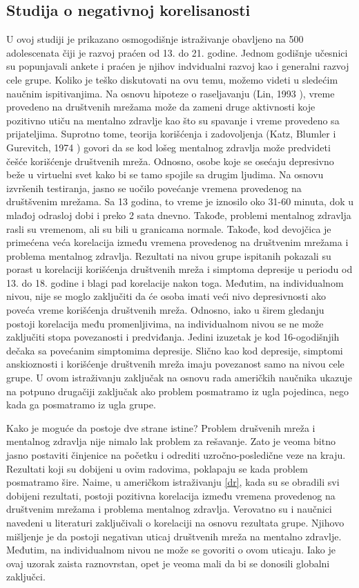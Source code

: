 \documentclass[a4paper]{article}
\begin{document}
{		\subsection{Studija o negativnoj korelisanosti}
		\label{dr}
		U ovoj studiji je prikazano osmogodišnje istraživanje obavljeno na 500 adolescenata čiji je razvoj praćen od 13. do 21. godine. Jednom godišnje učesnici su popunjavali ankete i praćen je njihov indvidualni razvoj kao i generalni razvoj cele grupe. Koliko je teško diskutovati na ovu temu, možemo videti u sledećim naučnim ispitivanjima. Na osnovu hipoteze o raseljavanju  (Lin, 1993 \cite{lin}), vreme provedeno na društvenih mrežama može da zameni druge aktivnosti koje pozitivno utiču na mentalno zdravlje kao što su spavanje i vreme provedeno sa prijateljima. Suprotno tome, teorija korišćenja i zadovoljenja (Katz, Blumler i Gurevitch, 1974 \cite{katz}) govori da se kod lošeg mentalnog zdravlja može predvideti češće korišćenje društvenih mreža. Odnosno, osobe koje se osećaju depresivno beže u virtuelni svet kako bi se tamo spojile sa drugim ljudima. Na osnovu izvršenih testiranja, jasno se uočilo povećanje vremena provedenog na društšvenim mrežama. Sa 13 godina, to vreme je iznosilo oko 31-60 minuta, dok u mlađoj odrasloj dobi i preko 2 sata dnevno. Takođe, problemi mentalnog zdravlja rasli su vremenom, ali su bili u granicama normale. Takođe, kod devojčica je primećena veća korelacija između vremena provedenog na društvenim mrežama i problema mentalnog zdravlja. Rezultati na nivou grupe ispitanih pokazali su porast u korelaciji korišćenja društvenih mreža i simptoma depresije u periodu od 13. do 18. godine i blagi pad korelacije nakon toga. Međutim, na individualnom nivou, nije se moglo zaključiti da će osoba imati veći nivo depresivnosti ako poveća vreme korišćenja društvenih mreža. Odnosno, iako u širem gledanju postoji korelacija među promenljivima, na individualnom nivou se ne može zaključiti stopa povezanosti i predviđanja. Jedini izuzetak je kod 16-ogodišnjih dečaka sa povećanim simptomima depresije. Slično kao kod depresije, simptomi anskioznosti i korišćenje društvenih mreža imaju
		povezanost samo na nivou cele grupe. U ovom istraživanju zaključak na osnovu rada američkih naučnika ukazuje na potpuno drugačiji zaključak ako problem posmatramo iz ugla pojedinca, nego kada ga posmatramo iz ugla grupe.
		
		\hspace{0.5mm}
		Kako je moguće da postoje dve strane istine? Problem drušvenih mreža i mentalnog zdravlja nije nimalo lak problem za rešavanje. Zato je veoma bitno jasno postaviti činjenice na početku i odrediti uzročno-posledične veze na kraju. Rezultati koji su dobijeni u ovim radovima, poklapaju se kada problem posmatramo šire. Naime, u američkom istraživanju \eqref{dr}, kada su se obradili svi dobijeni rezultati, postoji pozitivna korelacija između vremena provedenog na društvenim mrežama i problema mentalnog zdravlja. Verovatno su i naučnici navedeni u literaturi zaključivali o korelaciji na osnovu rezultata grupe. Njihovo mišljenje je da postoji negativan uticaj društvenih mreža na mentalno zdravlje. Međutim, na individualnom nivou ne može se govoriti o ovom uticaju. Iako je ovaj uzorak zaista raznovrstan, opet je veoma mali da bi se donosili globalni zaključci. 
		
}
\end{document}

